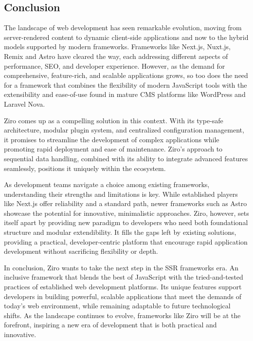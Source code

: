 \subsection{Conclusion}

The landscape of web development has seen remarkable evolution, moving from server-rendered content to dynamic client-side applications and now to the hybrid models supported by modern frameworks. Frameworks like Next.js, Nuxt.js, Remix and Astro have cleared the way, each addressing different aspects of performance, SEO, and developer experience. However, as the demand for comprehensive, feature-rich, and scalable applications grows, so too does the need for a framework that combines the flexibility of modern JavaScript tools with the extensibility and ease-of-use found in mature CMS platforms like WordPress and Laravel Nova.

Ziro comes up as a compelling solution in this context. With its type-safe architecture, modular plugin system, and centralized configuration management, it promises to streamline the development of complex applications while promoting rapid deployment and ease of maintenance. Ziro’s approach to sequential data handling, combined with its ability to integrate advanced features seamlessly, positions it uniquely within the ecosystem.

As development teams navigate a choice among existing frameworks, understanding their strengths and limitations is key. While established players like Next.js offer reliability and a standard path, newer frameworks such as Astro showcase the potential for innovative, minimalistic approaches. Ziro, however, sets itself apart by providing new paradigm to developers who need both foundational structure and modular extendibility. It fills the gaps left by existing solutions, providing a practical, developer-centric platform that encourage rapid application development without sacrificing flexibility or depth.

In conclusion, Ziro wants to take the next step in the SSR frameworks era. An inclusive framework that blends the best of JavaScript with the tried-and-tested practices of established web development platforms. Its unique features support developers in building powerful, scalable applications that meet the demands of today's web environment, while remaining adaptable to future technological shifts. As the landscape continues to evolve, frameworks like Ziro will be at the forefront, inspiring a new era of development that is both practical and innovative.

\pagebreak

